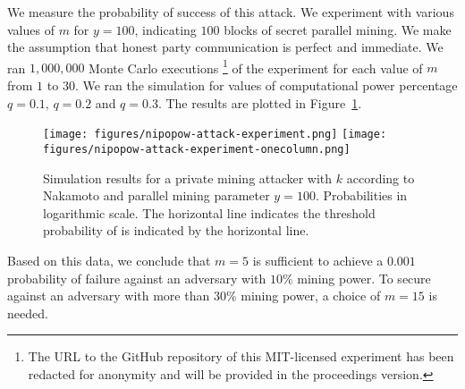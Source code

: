 We measure the probability of success of this attack. We experiment with various
values of $m$ for $y = 100$, indicating $100$ blocks of secret parallel mining.
We make the assumption that honest party communication is perfect and immediate.
We ran $1,000,000$ Monte Carlo executions \footnote{The URL to the GitHub
repository of this MIT-licensed experiment has been redacted for anonymity and
will be provided in the proceedings version.} of the experiment for each value
of $m$ from $1$ to $30$. We ran the simulation for values of computational power
percentage $q = 0.1$, $q = 0.2$ and $q = 0.3$. The results are plotted in
Figure~\ref{fig.nipopow-attack-experiment}.

\begin{figure}
    \caption{\label{fig.nipopow-attack-experiment}
        Simulation results for a private mining attacker with $k$ according to
        Nakamoto and parallel mining parameter $y = 100$. Probabilities in
        logarithmic scale. The horizontal line indicates the threshold
        probability of \cite{bitcoin} is indicated by the horizontal line.
    }
    \centering
    \iftwocolumn
        \texttt{[image: figures/nipopow-attack-experiment.png]}
    \else
        \texttt{[image: figures/nipopow-attack-experiment-onecolumn.png]}
    \fi
\end{figure}

Based on this data, we conclude that $m = 5$ is sufficient to achieve a $0.001$
probability of failure against an adversary with $10\%$ mining power. To secure
against an adversary with more than $30\%$ mining power, a choice of $m = 15$ is
needed.
